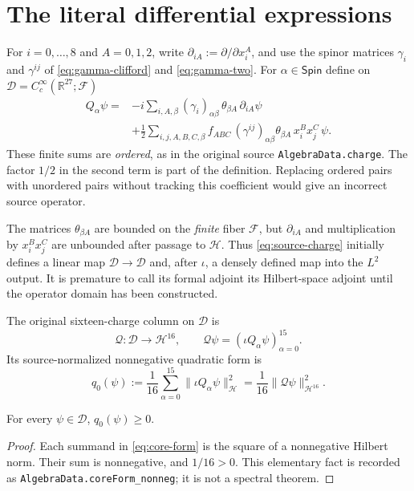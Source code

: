 \section{The literal differential expressions}
For $i=0,\ldots,8$ and $A=0,1,2$, write
$\partial_{iA}:=\partial/\partial x_i^A$, and use the spinor matrices
$\gamma_i$ and $\gamma^{ij}$ of \eqref{eq:gamma-clifford} and
\eqref{eq:gamma-two}. For $\alpha\in\mathsf{Spin}$ define on
$\mathscr D=C_c^\infty(\mathbb R^{27};\mathcal F)$
\begin{align}\label{eq:source-charge}
 Q_\alpha \psi
 ={}&-i\sum_{i,A,\beta}
   (\gamma_i)_{\alpha\beta}\,\theta_{\beta A}\,
   \partial_{iA}\psi \\
 &+\frac12\sum_{i,j,A,B,C,\beta}
 f_{ABC}\,(\gamma^{ij})_{\alpha\beta}
 \theta_{\beta A}\,x_i^B x_j^C\,\psi .\nonumber
\end{align}
These finite sums are \emph{ordered}, as in the original source
\texttt{AlgebraData.charge}. The factor $1/2$ in the second term is
part of the definition. Replacing ordered pairs with
unordered pairs without tracking this coefficient would give an incorrect
source operator.

The matrices $\theta_{\beta A}$ are bounded on the \emph{finite} fiber
$\mathcal F$, but $\partial_{iA}$ and multiplication by $x_i^B x_j^C$
are unbounded after passage to $\mathscr H$. Thus \eqref{eq:source-charge}
initially defines a linear map $\mathscr D\to\mathscr D$ and, after
$\iota$, a densely defined map into the $L^2$ output. It is premature to
call its formal adjoint its Hilbert-space adjoint until the operator domain
has been constructed.

\begin{definition}
The original sixteen-charge column on $\mathscr D$ is
\begin{equation}\label{eq:charge-column}
 \mathscr Q:\mathscr D\longrightarrow\mathscr H^{16},\qquad
 \mathscr Q\psi=(\iota Q_\alpha\psi)_{\alpha=0}^{15}.
\end{equation}
Its source-normalized nonnegative quadratic form is
\begin{equation}\label{eq:core-form}
 q_0(\psi):=\frac1{16}\sum_{\alpha=0}^{15}
 \bigl\|\iota Q_\alpha\psi\bigr\|_{\mathscr H}^{2}
 =\frac1{16}\|\mathscr Q\psi\|^2_{\mathscr H^{16}}.
\end{equation}
\end{definition}

\begin{sourceaccount}
For every $\psi\in\mathscr D$, $q_0(\psi)\geq0$.
\end{sourceaccount}
\begin{proof}
Each summand in \eqref{eq:core-form} is the square of a nonnegative
Hilbert norm. Their sum is nonnegative, and $1/16>0$. This elementary
fact is recorded as \texttt{AlgebraData.coreForm\_nonneg}; it is not a
spectral theorem.
\end{proof}

